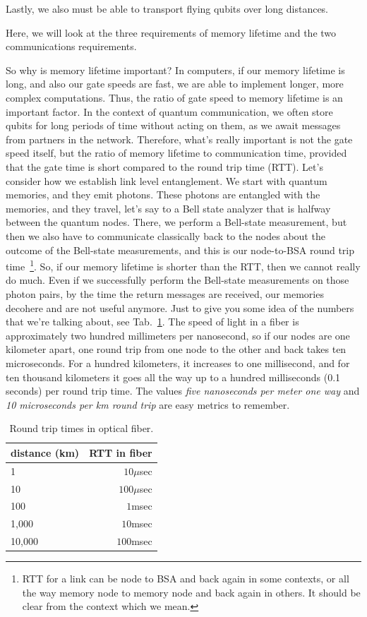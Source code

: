 Lastly, we also must be able to transport flying qubits over long distances.

Here, we will look at the three requirements of memory lifetime and the two communications requirements.

So why is memory lifetime important? In computers, if our memory lifetime is long, and also our gate speeds are fast, we are able to implement longer, more complex computations.  Thus, the ratio of gate speed to memory lifetime is an important factor. In the context of quantum communication, we often store qubits for long periods of time without acting on them, as we await messages from partners in the network.  Therefore, what's really important is not the gate speed itself, but the ratio of memory lifetime to communication time, 
provided that the gate time is short compared to the round trip time (RTT). Let's consider how we establish link level entanglement. We start with quantum memories, and they emit photons. These photons are entangled with the memories, and they travel, let's say to a Bell state analyzer that is halfway between the quantum nodes. There, we perform a Bell-state measurement, but then we also have to communicate classically back to the nodes about the outcome of the Bell-state measurements, and this is our node-to-BSA round trip time~\footnote{RTT for a link can be node to BSA and back again in some contexts, or all the way memory node to memory node and back again in others. It should be clear from the context which we mean.}. So, if our memory lifetime is shorter than the RTT, then we cannot really do much. Even if we successfully perform the Bell-state measurements on those photon pairs, by the time the return messages are received, our memories decohere and are not useful anymore. Just to give you some idea of the numbers that we're talking about, see Tab.~\ref{tab:rtt}. The speed of light in a fiber is approximately two hundred millimeters per nanosecond, so if our nodes are one kilometer apart, one round trip from one node to the other and back takes ten microseconds. For a hundred kilometers, it increases to one millisecond, and for ten thousand kilometers it goes all the way up to a hundred milliseconds (0.1 seconds) per round trip time.  The values \emph{five nanoseconds per meter one way} and \emph{10 microseconds per km round trip} are easy metrics to remember.

\begin{table}
\centering
\begin{tabular}{l|r}
distance (km)  & RTT in fiber \\\hline
1     & $10\mu$sec \\
10    & $100\mu$sec \\
100   & $1$msec \\
1,000 & $10$msec \\
10,000 & $100$msec
\end{tabular}
\caption{Round trip times in optical fiber.}
\label{tab:rtt}
\end{table}

